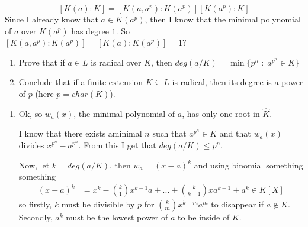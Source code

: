 \documentclass{article}
\begin{document}
    $$[K(a):K]=[K(a, a^p):K(a^p)][K(a^p):K]$$
    Since I already know that $a\in K(a^p)$, then I know that the minimal polynomial of $a$ over $K(a^p)$ has degree $1$. So $[K(a, a^p):K(a^p)]=[K(a):K(a^p)]=1$?









\begin{problem}[8]{}
\begin{enumerate}[label=(\alph*)]
    \item Prove that if $a\in L$ is radical over $K$, then $deg(a/K)=\min\{p^n\;:\;a^{p^n}\in K\}$
    \item Conclude that if a finite extension $K\subseteq L$ is radical, then its degree is a power of $p$ (here $p=char(K)$).
\end{enumerate}
\end{problem}

\begin{enumerate}[label=(\alph*), leftmargin=*]
    \item Ok, so $w_a(x)$, the minimal polynomial of $a$, has only one root in $\hat{K}$.

    I know that there exists aminimal $n$ such that $a^{p^n}\in K$ and that $w_a(x)$ divides $x^{p^n}-a^{p^n}$. From this I get that $deg(a/K)\leq p^n$.

    Now, let $k=deg(a/K)$, then $w_a=(x-a)^k$ and using binomial something something
    \begin{align*}
        (x-a)^k&=x^k-\binom{k}{1}x^{k-1}a+...+\binom{k}{k-1}xa^{k-1}+a^k\in K[X]
    \end{align*}
    so firstly, $k$ must be divisible by $p$ for $\binom{k}{m}x^{k-m}a^m$ to disappear if $a\notin K$. Secondly, $a^k$ must be the lowest power of $a$ to be inside of $K$.
\end{enumerate}
\end{document}
